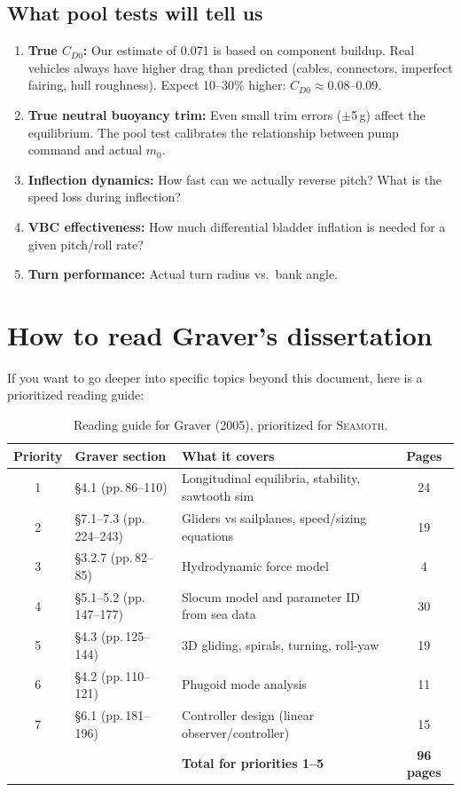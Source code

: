 \documentclass[11pt,a4paper]{article}
\newcommand{\seamoth}{\textsc{Seamoth}}
\begin{document}
\subsection{What pool tests will tell us}

\begin{enumerate}[nosep]
  \item \textbf{True $C_{D0}$:} Our estimate of 0.071 is based on component buildup.
    Real vehicles always have higher drag than predicted (cables, connectors, imperfect
    fairing, hull roughness).  Expect 10--30\% higher: $C_{D0}\approx0.08$--$0.09$.
  \item \textbf{True neutral buoyancy trim:} Even small trim errors ($\pm$5\,g) affect
    the equilibrium.  The pool test calibrates the relationship between pump command and
    actual $m_0$.
  \item \textbf{Inflection dynamics:} How fast can we actually reverse pitch?  What is
    the speed loss during inflection?
  \item \textbf{VBC effectiveness:} How much differential bladder inflation is needed for
    a given pitch/roll rate?
  \item \textbf{Turn performance:} Actual turn radius vs.\ bank angle.
\end{enumerate}


\section{How to read Graver's dissertation}
\label{sec:readingguide}

If you want to go deeper into specific topics beyond this document, here is a
prioritized reading guide:

\begin{table}[H]
\centering
\caption{Reading guide for Graver (2005), prioritized for \seamoth{}.}
\small
\begin{tabular}{@{}clp{6.5cm}c@{}}
\toprule
Priority & Graver section & What it covers & Pages \\
\midrule
1 & \S4.1 (pp.\,86--110) & Longitudinal equilibria, stability, sawtooth sim & 24 \\
2 & \S7.1--7.3 (pp.\,224--243) & Gliders vs sailplanes, speed/sizing equations & 19 \\
3 & \S3.2.7 (pp.\,82--85) & Hydrodynamic force model & 4 \\
4 & \S5.1--5.2 (pp.\,147--177) & Slocum model and parameter ID from sea data & 30 \\
5 & \S4.3 (pp.\,125--144) & 3D gliding, spirals, turning, roll-yaw & 19 \\
6 & \S4.2 (pp.\,110--121) & Phugoid mode analysis & 11 \\
7 & \S6.1 (pp.\,181--196) & Controller design (linear observer/controller) & 15 \\
\midrule
& & \textbf{Total for priorities 1--5} & \textbf{96 pages} \\
\bottomrule
\end{tabular}
\end{table}
\end{document}
